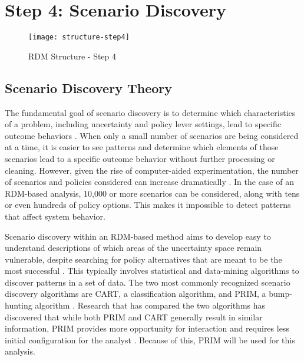 \chapter{Step 4: Scenario Discovery}\label{dev-step4}

\begin{abstract}
    The final piece in any RDM-based analysis is scenario discovery, which explores the data generated during uncertainty analysis to discover vulnerabilities that one or more of the identified policy alternatives does not address. This chapter will elaborate on the theory of scenario discovery in \cref{step4-scenariodiscovery} and will then detail the implementation used in this study \cref{step4-implementation}. 
\end{abstract}

\medskip

\begin{figure}[h]
    \centering
    \captionsetup{justification=centering}
    
    \texttt{[image: structure-step4]}
    \caption{RDM Structure - Step 4}
    \label{fig:structure-step4}
\end{figure}

\newpage

\section{Scenario Discovery Theory} \label{step4-scenariodiscovery}
The fundamental goal of scenario discovery is to determine which characteristics of a problem, including uncertainty and policy lever settings, lead to specific outcome behaviors \citep{Bryant2010}. When only a small number of scenarios are being considered at a time, it is easier to see patterns and determine which elements of those scenarios lead to a specific outcome behavior without further processing or cleaning. However, given the rise of computer-aided experimentation, the number of scenarios and policies considered can increase dramatically \citep{Lempert2008}. In the case of an RDM-based analysis, 10,000 or more scenarios can be considered, along with tens or even hundreds of policy options. This makes it impossible to detect patterns that affect system behavior. 

Scenario discovery within an RDM-based method aims to develop easy to understand descriptions of which areas of the uncertainty space remain vulnerable, despite searching for policy alternatives that are meant to be the most successful \citep{Kasprzyk2013}. This typically involves statistical and data-mining algorithms to discover patterns in a set of data. The two most commonly recognized scenario discovery algorithms are CART, a classification algorithm, and PRIM, a bump-hunting algorithm \citep{Lempert2008}. Research that has compared the two algorithms has discovered that while both PRIM and CART generally result in similar information, PRIM provides more opportunity for interaction and requires less initial configuration for the analyst \citep{Bryant2010}. Because of this, PRIM will be used for this analysis. 

